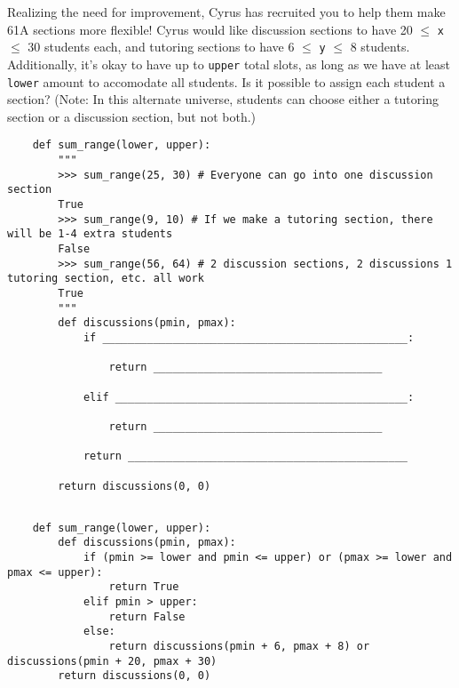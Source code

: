 \begin{blocksection}
    \question Realizing the need for improvement, Cyrus has recruited you to help them make 61A sections more flexible! 
    Cyrus would like discussion sections to have 20 $\leq$ \lstinline$x$ $\leq$ 30 students each, 
    and tutoring sections to have 6 $\leq$ \lstinline$y$ $\leq$ 8 students. 
    Additionally, it's okay to have up to \lstinline$upper$ total slots, as long as we have at least \lstinline$lower$ amount to accomodate all students.
    Is it possible to assign each student a section? (Note: In this alternate universe, students can choose either
    a tutoring section or a discussion section, but not both.)
    
    \begin{lstlisting}
    def sum_range(lower, upper):
        """
        >>> sum_range(25, 30) # Everyone can go into one discussion section
        True
        >>> sum_range(9, 10) # If we make a tutoring section, there will be 1-4 extra students
        False
        >>> sum_range(56, 64) # 2 discussion sections, 2 discussions 1 tutoring section, etc. all work
        True
        """
        def discussions(pmin, pmax):
            if ________________________________________________:
    
                return ____________________________________
    
            elif ______________________________________________:
    
                return ____________________________________
    
            return ____________________________________________
    
        return discussions(0, 0)
    
    \end{lstlisting}
    \end{blocksection}
    
    \begin{solution}[1.5in]
    \begin{blocksection}
    \begin{lstlisting}
    def sum_range(lower, upper):
        def discussions(pmin, pmax):
            if (pmin >= lower and pmin <= upper) or (pmax >= lower and pmax <= upper):
                return True
            elif pmin > upper:
                return False
            else:
                return discussions(pmin + 6, pmax + 8) or discussions(pmin + 20, pmax + 30)
        return discussions(0, 0)
    \end{lstlisting}
    
    \end{blocksection}
    \end{solution}
    
